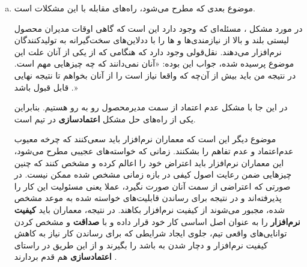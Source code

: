 {\begin{enumerate}[a)]
دلیل انجام این کار می‌تواند نیازمندی‌هایی باشد که به شکل ابهام‌امیز یا با دامنه خیلی وسیعی تعریف شده‌اند و به دلیل واضح نبودن، معماران سعی کنند که نرم‌افزار را انعطاف‌پذیر بسازند تا همه حالات را پوشش بدهد. در اصل ریشه مشکل در این است که معماران از انعطا‌ف‌پذیری به عنوان پوششی برای عدم قطعیت استفاده می‌کنند و به جای تصمیم‌گیری درست در شرایط سخت، سعی می‌کنند آن را با قابلیت‌های انعطاف‌پذیری در آینده پوشش داده و این تصمیم‌گیری را به عقب بیندازند \cite{Henny} . بدین ترتیب سیستمی را ایجاد می‌کنند که به شکلی فزاینده انعطاف‌پذیر است تا در آینده هر تصمیمی را بتوان روی آن اعمال کرد \cite{buschmann}.



\textbf{توجه بیش‌ از حد به پرفرمنس}:
 توصیفی که از این حالت می‌شود به این صورت است: «هر بخش سیستم به شکل مستقیم تحت تاثیر تمهیدات محلی اخذ شده برای تنظیم پرفرمنس است. هیچ استراتژی جامعی برای پرقرمنس وجود نداشته یا این استراتژی جامع سایر ویژگی‌های کیفی سیستم نظیر قابلیت تست یا قابلیت نگه‌داشت را نادیده می‌گیرد \cite{Marquardt}.» 
 
 این مشکل می‌تواند به شدت خود را در کنار دو مشکل دیگر بروز بدهد. در صورتی که سیستمی به دو مشکل دیگر دچار بشود، احتمالا در اواخر کار که مسئله ویژگی‌های کیفی نظیر پرفرمنس مطرح می‌شود، با مشکلاتی رو به رو شده و در آن مرحله به دلیل مشکلات قبلی و معماری بد سیستم، مجبور خواهند بود که به شکلی فزاینده قسمت‌های مختلف را به صورت مستقل بهینه‌سازی بکنند و در نتیجه‌ این بهینه‌سازی‌های بی‌رویه که برای پوشاندن معماری نامناسب سیستم انجام شده است، ویژگی‌های کیفی دیگر نظیر قابلیت نگه‌داشت از بین برود \cite{buschmann}.

 
 \item
 
 موضوع بعدی که مطرح می‌شود، راه‌های مقابله با این مشکلات است.
 
 در مورد مشکل ، مسئله‌ای که وجود دارد این است که گاهی اوقات مدیران محصول لیستی بلند و بالا از نیازمندی‌ها و  ها را با ددلاین‌های سخت‌گیرانه به تولیدکنندگان نرم‌افزار می‌دهند. نقل‌قولی وجود دارد که هنگامی که از یکی از‌ آنان علت این موضوع پرسیده شده، جواب این بوده‌: «آنان نمی‌دانند که چه چیزهایی مهم است. در نتیجه من باید بیش‌ از آن‌چه که واقعا نیاز است را از آنان بخواهم تا نتیجه نهایی قابل قبول باشد \cite{buschmann}.» 
 
 در این جا با مشکل عدم اعتماد از سمت مدیرمحصول رو به رو هستیم. بنابراین یکی از راه‌های حل مشکل \textbf{اعتمادسازی} در تیم است. 
 
 موضوع دیگر این است که معماران نرم‌افزار باید سعی‌کنند که چرخه معیوب عدم‌اعتماد و عدم تفاهم را بشکنند. زمانی که خواسته‌های عجیبی مطرح می‌شود، این معماران نرم‌افزار باید اعتراض خود را اعالم کرده و مشخص کنند که چنین چیزهایی ضمن رعایت اصول کیفی در بازه زمانی مشخص شده ممکن نیست. در صورتی که اعتراضی از سمت آنان صورت نگیرد، عملا یعنی مسئولیت این کار را پذیرفته‌اند و در نتیجه برای رساندن قابلیت‌های خواسته شده به موعد مشخص شده، مجبور می‌شوند از کیفیت نرم‌افزار بکاهند.  در نتیجه، معماران باید \textbf{کیفیت نرم‌افزار} را به عنوان اصل اساسی کار خود قرار داده و با \textbf{صداقت} و مشخص کردن توانایی‌های واقعی تیم، جلوی ایجاد شرایطی که برای رساندن کار نیاز به کاهش کیفیت نرم‌افزار و دچار شدن به  باشد را بگیرند و از این طریق در راستای \textbf{اعتمادسازی} هم قدم بردارند \cite{buschmann}.
 

\end{enumerate}}
